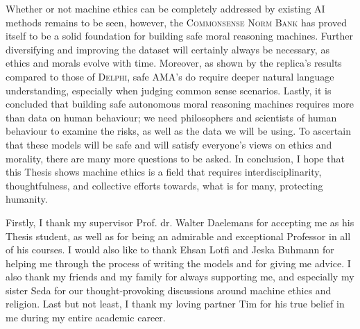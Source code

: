 \documentclass[final]{clv3} %
\begin{document}
Whether or not machine ethics can be completely addressed by existing AI methods remains to be seen, however, the \textsc{Commonsense Norm Bank} has proved itself to be a solid foundation for building safe moral reasoning machines. Further diversifying and improving the dataset will certainly always be necessary, as ethics and morals evolve with time. Moreover, as shown by the replica’s results compared to those of \textsc{Delphi}, safe AMA’s do require deeper natural language understanding, especially when judging common sense scenarios. Lastly, it is concluded that building safe autonomous moral reasoning machines requires more than data on human behaviour; we need philosophers and scientists of human behaviour to examine the risks, as well as the data we will be using. To ascertain that these models will be safe and will satisfy everyone’s views on ethics and morality, there are many more questions to be asked. In conclusion, I hope that this Thesis shows machine ethics is a field that requires interdisciplinarity, thoughtfulness, and collective efforts towards, what is for many, protecting humanity.

\clearpage

\begin{acknowledgments}
Firstly, I thank my supervisor Prof. dr. Walter Daelemans for accepting me as his Thesis student, as well as for being an admirable and exceptional Professor in all of his courses. I would also like to thank Ehsan Lotfi and Jeska Buhmann for helping me through the process of writing the models and for giving me advice. I also thank my friends and my family for always supporting me, and especially my sister Seda for our thought-provoking discussions around machine ethics and religion. Last but not least, I thank my loving partner Tim for his true belief in me during my entire academic career. 
\end{acknowledgments}

\clearpage



\let\clearpage\relax
\end{document}
